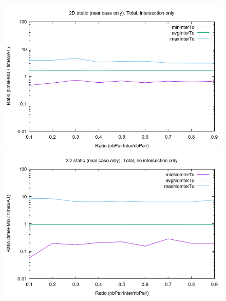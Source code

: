 \documentclass[12pt, a4paper]{article}
\begin{document}
\begin{center}
\begin{figure}[H]
\centering\includegraphics[width=12cm]{../Results/qualification2DinterNearCaseOnly.png}\\
\centering\includegraphics[width=12cm]{../Results/qualification2DnointerNearCaseOnly.png}\\
\end{figure}
\end{center}
\end{document}
